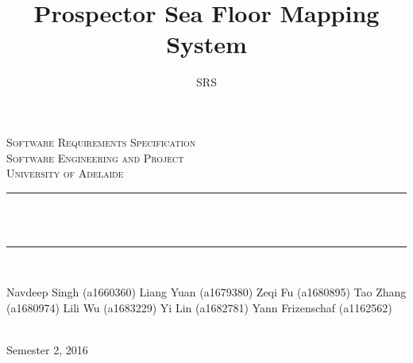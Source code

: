 \documentclass[12pt]{article}
\title{Prospector Sea Floor Mapping System}
\author{SRS}
\makeatletter
\let\thetitle\@title
\makeatother
\begin{document}

\begin{titlepage}
	\centering
    \vspace*{0.0 cm}
    \textsc{\LARGE Software Requirements Specification}\\[2.0 cm]
	\textsc{\Large Software Engineering and Project}\\[0.5 cm]			
	\textsc{\large University of Adelaide}\\[0.5 cm]
	\rule{\linewidth}{0.2 mm} \\[0.4 cm]
	{ \huge \bfseries \thetitle}\\
	\rule{\linewidth}{0.2 mm} \\[1.5 cm]
	
	\begin{minipage}{0.4\textwidth}
		\begin{center} \large
			Navdeep Singh (a1660360)\linebreak
			Liang Yuan (a1679380)\linebreak
			Zeqi Fu (a1680895)\linebreak
			Tao Zhang (a1680974)\linebreak
			Lili Wu (a1683229)\linebreak
			Yi Lin (a1682781)\linebreak
            Yann Frizenschaf (a1162562)\linebreak
			\end{center}
	\end{minipage}\\[2 cm]
	
	{\large Semester 2, 2016}\\[2 cm]
 
	\vfill
	
\end{titlepage}

\end{document}
